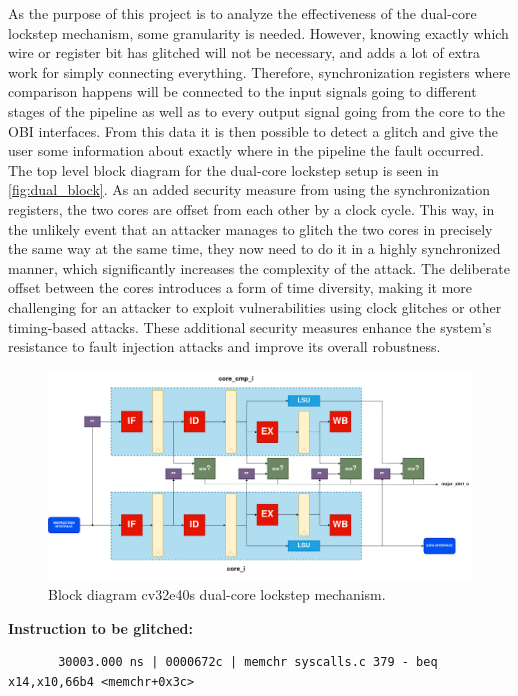 As the purpose of this project is to analyze the effectiveness of the dual-core lockstep mechanism, some granularity is needed. However, knowing exactly which wire or register bit has glitched will not be necessary, and adds a lot of extra work for simply connecting everything. Therefore, synchronization registers where comparison happens will be connected to the input signals going to different stages of the pipeline as well as to every output signal going from the core to the OBI interfaces. From this data it is then possible to detect a glitch and give the user some information about exactly where in the pipeline the fault occurred. The top level block diagram for the dual-core lockstep setup is seen in \autoref{fig:dual_block}. 
As an added security measure from using the synchronization registers, the two cores are offset from each other by a clock cycle. This way, in the unlikely event that an attacker manages to glitch the two cores in precisely the same way at the same time, they now need to do it in a highly synchronized manner, which significantly increases the complexity of the attack. The deliberate offset between the cores introduces a form of time diversity, making it more challenging for an attacker to exploit vulnerabilities using clock glitches or other timing-based attacks. These additional security measures enhance the system's resistance to fault injection attacks and improve its overall robustness.

\begin{figure}[h!]
    \centering
    \includegraphics[width=\textwidth]{docs/images/dual_cores-block.png}
    \caption{Block diagram cv32e40s dual-core lockstep mechanism.}
    \label{fig:dual_block}
\end{figure}

\textbf{Instruction to be glitched:}
\begin{lstlisting}
       30003.000 ns | 0000672c | memchr syscalls.c 379 - beq x14,x10,66b4 <memchr+0x3c>
\end{lstlisting}


